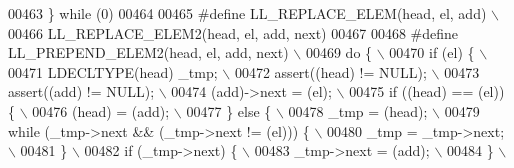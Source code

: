\begin{DoxyCode}
00463 \textcolor{preprocessor}{\} while (0)}
00464 
00465 \textcolor{preprocessor}{#define LL\_REPLACE\_ELEM(head, el, add)                                                         \(\backslash\)}
00466 \textcolor{preprocessor}{    LL\_REPLACE\_ELEM2(head, el, add, next)}
00467 
00468 \textcolor{preprocessor}{#define LL\_PREPEND\_ELEM2(head, el, add, next)                                                  \(\backslash\)}
00469 \textcolor{preprocessor}{do \{                                                                                           \(\backslash\)}
00470 \textcolor{preprocessor}{ if (el) \{                                                                                     \(\backslash\)}
00471 \textcolor{preprocessor}{  LDECLTYPE(head) \_tmp;                                                                        \(\backslash\)}
00472 \textcolor{preprocessor}{  assert((head) != NULL);                                                                      \(\backslash\)}
00473 \textcolor{preprocessor}{  assert((add) != NULL);                                                                       \(\backslash\)}
00474 \textcolor{preprocessor}{  (add)->next = (el);                                                                          \(\backslash\)}
00475 \textcolor{preprocessor}{  if ((head) == (el)) \{                                                                        \(\backslash\)}
00476 \textcolor{preprocessor}{   (head) = (add);                                                                             \(\backslash\)}
00477 \textcolor{preprocessor}{  \} else \{                                                                                     \(\backslash\)}
00478 \textcolor{preprocessor}{   \_tmp = (head);                                                                              \(\backslash\)}
00479 \textcolor{preprocessor}{   while (\_tmp->next && (\_tmp->next != (el))) \{                                                \(\backslash\)}
00480 \textcolor{preprocessor}{    \_tmp = \_tmp->next;                                                                         \(\backslash\)}
00481 \textcolor{preprocessor}{   \}                                                                                           \(\backslash\)}
00482 \textcolor{preprocessor}{   if (\_tmp->next) \{                                                                           \(\backslash\)}
00483 \textcolor{preprocessor}{     \_tmp->next = (add);                                                                       \(\backslash\)}
00484 \textcolor{preprocessor}{   \}                                                                                           \(\backslash\)}

\end{DoxyCode}
